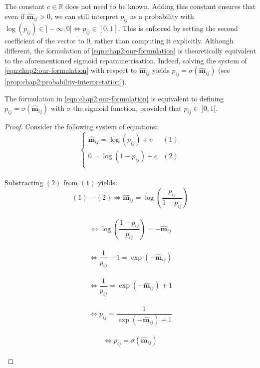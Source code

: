 The constant $c \in \mathds{R}$ does not need to be known.
Adding this constant ensures that even if $\bm{\hat{m}}_{ij} > 0$, we can still interpret $p_{ij}$
as a probability with $\log(p_{ij}) \in ]-\infty,0] \Leftrightarrow p_{ij} \in [0,1]$. This is
enforced by setting the second coefficient of the vector to 0, rather
than computing it explicitly. Although different, the formulation of
\cref{eqn:chap2:our-formulation} is theoretically equivalent to the
aforementioned sigmoid reparametrisation. Indeed, solving the system of
\cref{eqn:chap2:our-formulation} with respect to $\bm{\hat{m}}_{ij}$ yields $p_{ij} =
  \sigma(\bm{\hat{m}}_{ij})$ (see \cref{prop:chap2:probability-interpretation}). \\

\begin{proposition}
  \label{prop:chap2:probability-interpretation}
  The formulation in \cref{eqn:chap2:our-formulation} is equivalent to defining
  $p_{ij} = \sigma(\bm{\hat{m}}_{ij})$ with $\sigma$ the sigmoid function,
  provided that $p_{ij}\in ~ ]0,1[$.
\end{proposition}
\vspace*{\baselineskip}

\begin{proof}
  Consider the following system of equations:\\
  $$
    \left\{
    \begin{array}{ll}
      \bm{\hat{m}}_{ij} = \log(p_{ij})+c & (1) \\
      0 = \log(1-p_{ij})+c               & (2) \\
    \end{array}
    \right.
  $$\\
  Substracting $(2)$ from $(1)$ yields:\\
  $$ (1) - (2) \Leftrightarrow \bm{\hat{m}}_{ij} = \displaystyle\log\left( \frac{p_{ij}}{1 - p_{ij}} \right)$$\\
  $$ \Leftrightarrow \log\left(\frac{1-p_{ij}}{p_{ij}} \right) = -
    \bm{\hat{m}}_{ij}$$\\
  $$ \Leftrightarrow \frac{1}{p_{ij}} - 1 = \exp(-\bm{\hat{m}}_{ij})$$\\
  $$ \Leftrightarrow \frac{1}{p_{ij}} = \exp(-\bm{\hat{m}}_{ij}) + 1$$\\
  $$ \Leftrightarrow p_{ij} = \frac{1}{\exp(-\bm{\hat{m}}_{ij}) + 1}$$\\
  $$ \Leftrightarrow p_{ij} = \sigma(\bm{\hat{m}}_{ij})$$\\

\end{proof}



